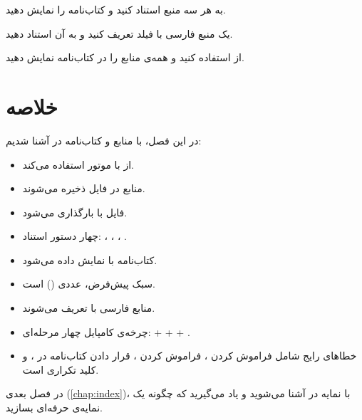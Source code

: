 \begin{exercise}
    به هر سه منبع استناد کنید و کتاب‌نامه را
    نمایش دهید.
    \label{exc:bibliography-cite}
\end{exercise}

\begin{exercise}
    یک منبع فارسی با فیلد  تعریف
    کنید و به آن استناد دهید.
    \label{exc:bibliography-persian}
\end{exercise}

\begin{exercise}
    از  استفاده کنید و همه‌ی
    منابع را در کتاب‌نامه نمایش دهید.
    \label{exc:bibliography-nocite}
\end{exercise}

\section{خلاصه}
\label{sec:bibliography-summary}

در این فصل، با منابع و کتاب‌نامه در 
آشنا شدیم:

\begin{itemize}
    \item {} از  با
    موتور  استفاده می‌کند.

    \item منابع در فایل  ذخیره می‌شوند.

    \item فایل  با 
    بارگذاری می‌شود.

    \item چهار دستور استناد: ،
    ، ، .

    \item کتاب‌نامه با 
    نمایش داده می‌شود.

    \item سبک پیش‌فرض، عددی () است.

    \item منابع فارسی با 
    تعریف می‌شوند.

    \item چرخه‌ی کامپایل چهار مرحله‌ای: 
    +  +  + .

    \item خطاهای رایج شامل فراموش کردن
    ، فراموش کردن ،
    قرار دادن کتاب‌نامه در ، و کلید
    تکراری است.
\end{itemize}

در فصل بعدی (\cref{chap:index})، با نمایه در
 آشنا می‌شوید و یاد می‌گیرید
که چگونه یک نمایه‌ی حرفه‌ای بسازید.